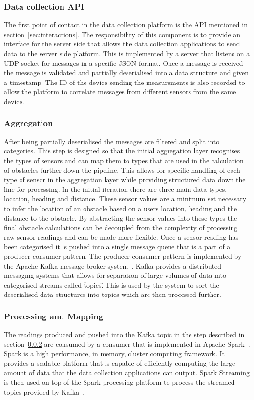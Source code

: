 \documentclass[prodmode,acmtosem]{acmsmall} %
\begin{document}
\subsubsection{Data collection API}
The first point of contact in the data collection platform is the API mentioned in section~\ref{sec:interactions}. The responsibility of this component is to provide an interface for the server side that allows the data collection applications to send data to the server side platform. This is implemented by a server that listens on a UDP socket for messages in a specific JSON format. Once a message is received the message is validated and partially deserialised into a data structure and given a timestamp. The ID of the device sending the measurements is also recorded to allow the platform to correlate messages from different sensors from the same device.

\subsubsection{Aggregation}
\label{sec:aggregation}
After being partially deserialised the messages are filtered and split into categories. This step is designed so that the initial aggregation layer recognises the types of sensors and can map them to types that are used in the calculation of obstacles further down the pipeline. This allows for specific handling of each type of sensor in the aggregation layer while providing structured data down the line for processing. In the initial iteration there are three main data types, location, heading and distance. These sensor values are a minimum set necessary to infer the location of an obstacle based on a users location, heading and the distance to the obstacle. By abstracting the sensor values into these types the final obstacle calculations can be decoupled from the complexity of processing raw sensor readings and can be made more flexible. Once a sensor reading has been categorised it is pushed into a single message queue that is a part of a producer-consumer pattern. The producer-consumer pattern is implemented by the Apache Kafka message broker system~\cite{ApacheKafka}. Kafka provides a distributed messaging systems that allows for separation of large volumes of data into categorised streams called \"topics\". This is used by the system to sort the deserialised data structures into topics which are then processed further.

\subsubsection{Processing and Mapping}
The readings produced and pushed into the Kafka topic in the step described in section~\ref{sec:aggregation} are consumed by a consumer that is implemented in Apache Spark~\cite{ApacheSpark}. Spark is a high performance, in memory, cluster computing framework. It provides a scalable platform that is capable of efficiently computing the large amount of data that the data collection applications can output. Spark Streaming is then used on top of the Spark processing platform to process the streamed topics provided by Kafka~\cite{ApacheSparkStreaming}.
\end{document}
